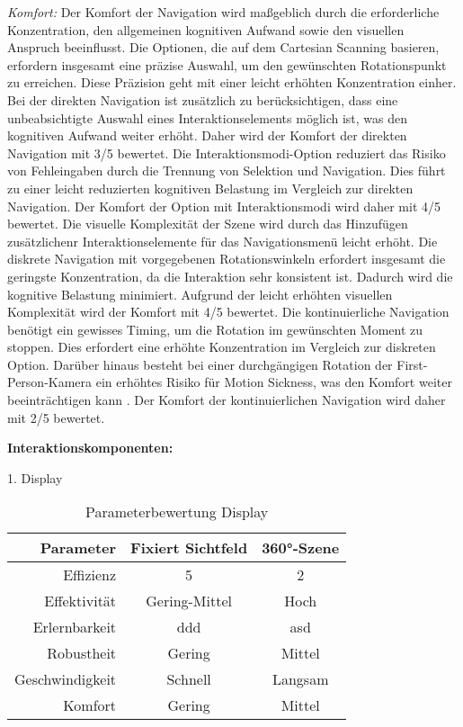 \textit{Komfort:}
Der Komfort der Navigation wird maßgeblich durch die erforderliche Konzentration, den allgemeinen kognitiven Aufwand sowie den visuellen Anspruch beeinflusst. Die Optionen, die auf dem Cartesian Scanning basieren, erfordern insgesamt eine präzise Auswahl, um den gewünschten Rotationspunkt zu erreichen. Diese Präzision geht mit einer leicht erhöhten Konzentration einher. Bei der direkten Navigation ist zusätzlich zu berücksichtigen, dass eine unbeabsichtigte Auswahl eines Interaktionselements möglich ist, was den kognitiven Aufwand weiter erhöht. Daher wird der Komfort der direkten Navigation mit 3/5 bewertet. Die Interaktionsmodi-Option reduziert das Risiko von Fehleingaben durch die Trennung von Selektion und Navigation. Dies führt zu einer leicht reduzierten kognitiven Belastung im Vergleich zur direkten Navigation. Der Komfort der Option mit Interaktionsmodi wird daher mit 4/5 bewertet. Die visuelle Komplexität der Szene wird durch das Hinzufügen zusätzlichenr Interaktionselemente für das Navigationsmenü leicht erhöht. Die diskrete Navigation mit vorgegebenen Rotationswinkeln erfordert insgesamt die geringste Konzentration, da die Interaktion sehr konsistent ist. Dadurch wird die kognitive Belastung minimiert. Aufgrund der leicht erhöhten visuellen Komplexität wird der Komfort mit 4/5 bewertet. 
Die kontinuierliche Navigation benötigt ein gewisses Timing, um die Rotation im gewünschten Moment zu stoppen. Dies erfordert eine erhöhte Konzentration im Vergleich zur diskreten Option. Darüber hinaus besteht bei einer durchgängigen Rotation der First-Person-Kamera ein erhöhtes Risiko für Motion Sickness, was den Komfort weiter beeinträchtigen kann \citep{10.1007/s10055-020-00425-x, 8797722}. Der Komfort der kontinuierlichen Navigation wird daher mit 2/5 bewertet.

{\normalfont \bfseries Interaktionskomponenten:} 

1. Display

\begin{table}[ht]
 \centering
 \begin{tabular}{r|c|c} 
 Parameter & Fixiert Sichtfeld & 360°-Szene\\
 \hline
 Effizienz & 5 & 2\\
 Effektivität & Gering-Mittel & Hoch \\
 Erlernbarkeit & ddd & asd \\
 Robustheit & Gering & Mittel \\
 Geschwindigkeit & Schnell & Langsam \\
 Komfort & Gering & Mittel \\ 
 \end{tabular}
 \caption{Parameterbewertung Display}
 \label{tab:Display}
\end{table}

